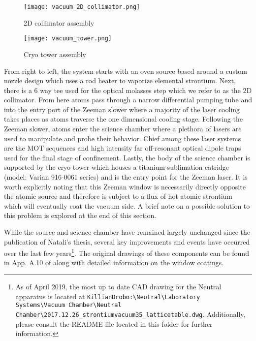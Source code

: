 	\begin{figure} 
		\centerline{
		\texttt{[image: vacuum\_2D\_collimator.png]}}
		\caption{2D collimator assembly}
		\label{fig:assembly_2Dcoll}
	\end{figure}
	
	\begin{figure} 
		\centerline{
		\texttt{[image: vacuum\_tower.png]}}
		\caption{Cryo tower assembly}
		\label{fig:cryoTower}
	\end{figure}
From right to left, the system starts with an oven source based around a custom nozzle design which uses a rod heater to vaporize elemental strontium.
Next, there is a 6 way tee used for the optical molasses step which we refer to as the 2D collimator. 
From here atoms pass through a narrow differential pumping tube and into the entry port of the Zeeman slower where a majority of the laser cooling takes places as atoms traverse the one dimensional cooling stage. 
Following the Zeeman slower, atoms enter the science chamber where a plethora of lasers are used to manipulate and probe their behavior.
Chief among these laser systems are the MOT sequences and high intensity far off-resonant optical dipole traps used for the final stage of confinement.
Lastly, the body of the science chamber is supported by the cryo tower which houses a titanium sublimation catridge (model: Varian 916-0061 series) and is the entry point for the Zeeman laser.
It is worth explicitly noting that this Zeeman window is necessarily directly opposite the atomic source and therefore is subject to a flux of hot atomic strontium which will eventually coat the vacuum side. A brief note on a possible solution to this problem is explored at the end of this section.

While the source and science chamber have remained largely unchanged since the publication of Natali's thesis, several key improvements and events have occurred over the last few years\footnote{As of April 2019, the most up to date CAD drawing for the Neutral apparatus is located at \texttt{KillianDrobo:\textbackslash Neutral\textbackslash Laboratory Systems\textbackslash Vacuum Chamber\textbackslash Neutral Chamber\textbackslash 2017.12.26\_strontiumvacuum35\_latticetable.dwg}. Additionally, please consult the README file located in this folder for further information.}.
The original drawings of these components can be found in App. A.10 of \cite{MartinezdeEscolar2010} along with detailed information on the window coatings.


